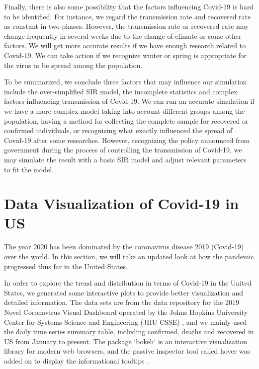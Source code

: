 \documentclass{article}
\begin{document}
Finally, there is also some possibility that the factors influencing Covid-19 is hard to be identified. For instance, we regard the transmission rate and recovered rate as constant in two phases. However, the transmission rate or recovered rate may change frequently in several weeks due to the change of climate or some other factors. We will get more accurate results if we have enough research related to Covid-19. We can take action if we recognize winter or spring is appropriate for the virus to be spread among the population.


To be summarized, we conclude three factors that may influence our simulation include the over-simplified SIR model, the incomplete statistics and complex factors influencing transmission of Covid-19. We can run an accurate simulation if we have a more complex model taking into account different groups among the population, having a method for collecting the complete sample for recovered or confirmed individuals, or recognizing what exactly influenced the spread of Covid-19 after some researches. However, recognizing the policy announced from government during the process of controlling the transmission of Covid-19, we may simulate the result with a basic SIR model and adjust relevant parameters to fit the model.










\section{Data Visualization of Covid-19 in US}

The year 2020 has been dominated by the coronavirus disease 2019 (Covid-19) over the world. In this section, we will take an updated look at how the pandemic progressed thus far in the United States.


In order to explore the trend and distribution in terms of Covid-19 in the United States, we generated some interactive plots to provide better visualization and detailed information. The data sets are from the data repository for the 2019 Novel Coronavirus Visual Dashboard operated by the Johns Hopkins University Center for Systems Science and Engineering (JHU CSSE) \cite{Johnhopkins}, and we mainly used the daily time series summary table, including confirmed, deaths and recovered in US from January to present. The package `bokeh` is an interactive visualization library for modern web browsers, and the passive inspector tool called hover was added on to display the informational tooltips \cite{bokeh}.
\end{document}
